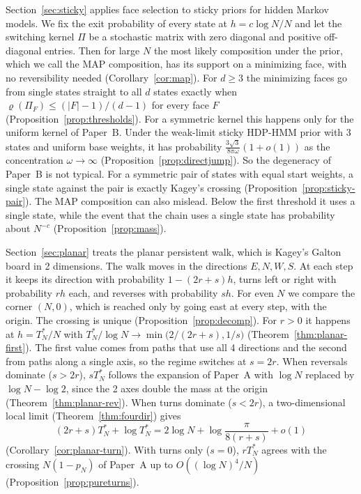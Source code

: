 Section~\ref{sec:sticky} applies face selection to sticky priors for hidden
Markov models. We fix the exit probability of every state at
$h=c\log N/N$ and let the
switching kernel $\Pi$ be a stochastic matrix with zero diagonal and
positive off-diagonal entries. Then for large $N$ the most likely
composition under the prior, which we call the MAP composition, has its
support on a minimizing face, with no reversibility needed
(Corollary~\ref{cor:map}). For $d\ge3$ the minimizing faces go from single
states straight to all $d$ states exactly when
$\varrho(\Pi_F)\le(\lvert F\rvert-1)/(d-1)$ for every face $F$
(Proposition~\ref{prop:thresholds}). For a symmetric kernel this happens
only for the uniform kernel of Paper~B. Under the weak-limit sticky HDP-HMM
prior with 3 states and uniform base weights, it has probability
$\frac{3\sqrt3}{8\pi\omega}(1+o(1))$ as the concentration $\omega\to\infty$
(Proposition~\ref{prop:directjump}). So the degeneracy of Paper~B is not
typical. For a symmetric pair of states with equal start weights, a single
state against the pair is exactly Kagey's crossing
(Proposition~\ref{prop:sticky-pair}). The MAP composition can also mislead.
Below the first threshold it uses a single state, while the event that the
chain uses a single state has probability about $N^{-c}$
(Proposition~\ref{prop:mass}).

Section~\ref{sec:planar} treats the planar persistent walk, which is
Kagey's Galton board in 2 dimensions. The walk moves in the directions
$E,N,W,S$. At each step it keeps its direction with probability
$1-(2r+s)h$, turns left or right with probability $rh$ each, and reverses
with probability $sh$. For even $N$ we compare the corner $(N,0)$, which is
reached only by going east at every step, with the origin. The crossing is
unique (Proposition~\ref{prop:decomp}). For $r>0$ it happens at
$h=T^*_N/N$ with $T^*_N/\log N\to\min\bigl(2/(2r+s),1/s\bigr)$
(Theorem~\ref{thm:planar-first}). The first value comes from paths that use
all 4 directions and the second from paths along a single axis, so the
regime switches at $s=2r$. When reversals dominate ($s>2r$), $sT^*_N$
follows the expansion of Paper~A with $\log N$ replaced by $\log N-\log2$,
since the 2 axes double the mass at the origin
(Theorem~\ref{thm:planar-rev}). When turns dominate ($s<2r$), a
two-dimensional local limit (Theorem~\ref{thm:fourdir}) gives
\[
 (2r+s)T^*_N+\log T^*_N=2\log N+\log\frac{\pi}{8(r+s)}+o(1)
\]
(Corollary~\ref{cor:planar-turn}). With turns only ($s=0$), $rT^*_N$ agrees
with the crossing $N(1-p_N)$ of Paper~A up to $O((\log N)^4/N)$
(Proposition~\ref{prop:pureturns}).

